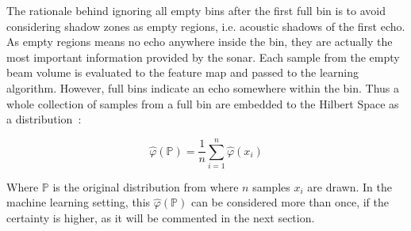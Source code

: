 The rationale behind ignoring all empty bins after the first full bin is to
avoid considering shadow zones as empty regions, i.e. acoustic shadows of the
first echo. As empty regions means no echo anywhere inside the bin, they are
actually the most important information provided by the sonar. Each sample from
the empty beam volume is evaluated to the feature map and passed to the learning
algorithm. However, full bins indicate an echo somewhere within the bin. Thus
a whole collection of samples from a full bin are embedded to the Hilbert Space
as a distribution~\cite{song2013kernel,ramos2016hilbert}:

\begin{equation}
\label{eq:embedding}
\hat{\varphi}(\mathbb{P})=\frac{1}{n}\sum_{i=1}^n\hat{\varphi}(x_i)
\end{equation}

Where $\mathbb{P}$ is the original distribution from where $n$ samples $x_i$ are
drawn. In the machine learning setting, this $\hat{\varphi}(\mathbb{P})$ can be
considered more than once, if the certainty is higher, as it will be commented
in the next section.
